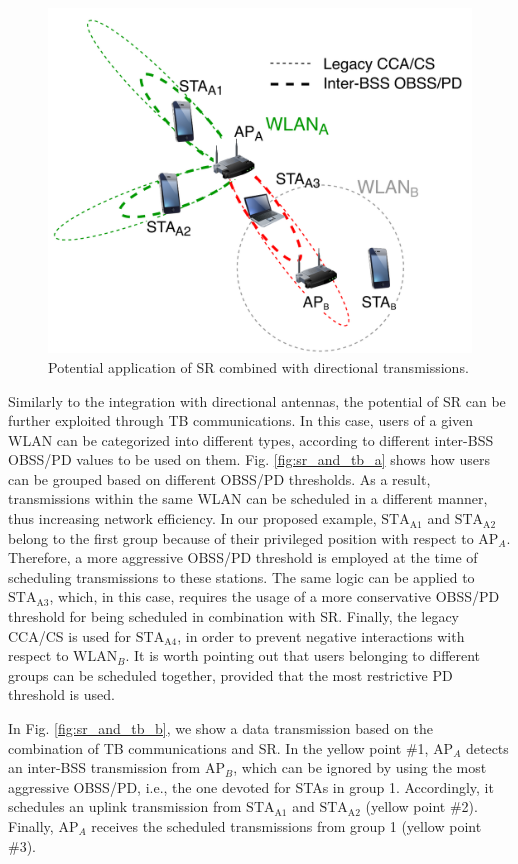 \documentclass[comsoc]{IEEEtran}
\begin{document}
	\begin{figure}[ht!]
		\centering		
		\includegraphics[width=0.9\columnwidth]{sr_and_beamforming}
		\caption{Potential application of SR combined with directional transmissions.}
		\label{fig:sr_and_beamforming}
	\end{figure}
	
	Similarly to the integration with directional antennas, the potential of SR can be further exploited through TB communications. In this case, users of a given WLAN can be categorized into different types, according to different inter-BSS OBSS/PD values to be used on them. Fig. \ref{fig:sr_and_tb_a} shows how users can be grouped based on different OBSS/PD thresholds. As a result, transmissions within the same WLAN can be scheduled in a different manner, thus increasing network efficiency. In our proposed example, $\text{STA}_\text{A1}$ and $\text{STA}_\text{A2}$ belong to the first group because of their privileged position with respect to $\text{AP}_A$. Therefore, a more aggressive OBSS/PD threshold is employed at the time of scheduling transmissions to these stations. The same logic can be applied to $\text{STA}_\text{A3}$, which, in this case, requires the usage of a more conservative OBSS/PD threshold for being scheduled in combination with SR. Finally, the legacy CCA/CS is used for $\text{STA}_\text{A4}$, in order to prevent negative interactions with respect to $\text{WLAN}_B$. It is worth pointing out that users belonging to different groups can be scheduled together, provided that the most restrictive PD threshold is used. 
	
	In Fig. \ref{fig:sr_and_tb_b}, we show a data transmission based on the combination of TB communications and SR. In the yellow point \#1, $\text{AP}_A$ detects an inter-BSS transmission from $\text{AP}_B$, which can be ignored by using the most aggressive OBSS/PD, i.e., the one devoted for STAs in group 1. Accordingly, it schedules an uplink transmission from $\text{STA}_\text{A1}$ and $\text{STA}_\text{A2}$ (yellow point \#2). Finally, $\text{AP}_A$ receives the scheduled transmissions from group 1 (yellow point \#3).
	
\end{document}
